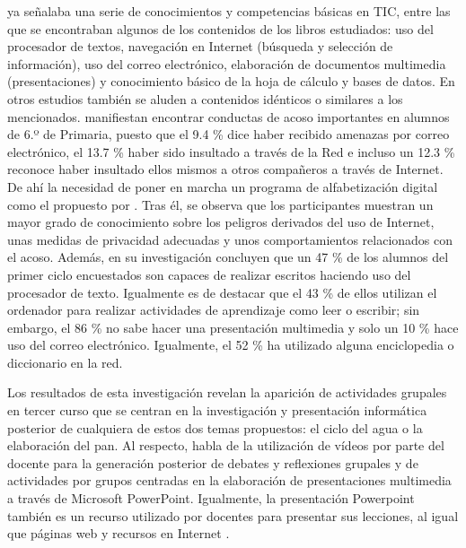 \documentclass[spanish]{textolivre}
\begin{document}
\textcite{marques_graells_nueva_2007} ya señalaba una serie de conocimientos y competencias básicas en TIC, entre las que se encontraban algunos de los contenidos de los libros estudiados: uso del procesador de textos, navegación en Internet (búsqueda y selección de información), uso del correo electrónico, elaboración de documentos multimedia (presentaciones) y conocimiento básico de la hoja de cálculo y bases de datos. En otros estudios también se aluden a contenidos idénticos o similares a los mencionados. \textcite{fernandez-montalvo_habitos_2015} manifiestan encontrar conductas de acoso importantes en alumnos de 6.º de Primaria, puesto que el 9.4 \% dice haber recibido amenazas por correo electrónico, el 13.7 \% haber sido insultado a través de la Red e incluso un 12.3 \% reconoce haber insultado ellos mismos a otros compañeros a través de Internet. De ahí la necesidad de poner en marcha un programa de alfabetización digital como el propuesto por \textcite{fernandez-montalvo_effectiveness_2017}. Tras él, se observa que los participantes muestran un mayor grado de conocimiento sobre los peligros derivados del uso de Internet, unas medidas de privacidad adecuadas y unos comportamientos relacionados con el acoso. Además, \textcite{gamiz_sanchez_estudio_2016} en su investigación concluyen que un 47 \% de los alumnos del primer ciclo encuestados son capaces de realizar escritos haciendo uso del procesador de texto. Igualmente es de destacar que el 43 \% de ellos utilizan el ordenador para realizar actividades de aprendizaje como leer o escribir; sin embargo, el 86 \% no sabe hacer una presentación multimedia y solo un 10 \% hace uso del correo electrónico. Igualmente, el 52 \% ha utilizado alguna enciclopedia o diccionario en la red. 

Los resultados de esta investigación revelan la aparición de actividades grupales en tercer curso que se centran en la investigación y presentación informática posterior de cualquiera de estos dos temas propuestos: el ciclo del agua o la elaboración del pan. Al respecto, \textcite{martin_garcia_alisis_2016} habla de la utilización de vídeos por parte del docente para la generación posterior de debates y reflexiones grupales y de actividades por grupos centradas en la elaboración de presentaciones multimedia a través de Microsoft PowerPoint. Igualmente, la presentación Powerpoint también es un recurso utilizado por docentes para presentar sus lecciones, al igual que páginas web y recursos en Internet \cite{trujillo_torres_caracterizacion_2011}.
\end{document}
